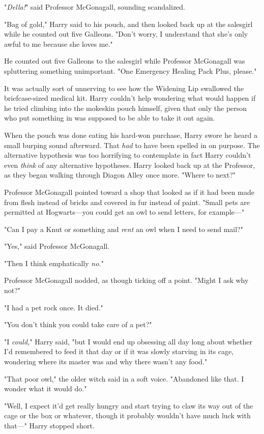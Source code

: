 "\emph{Della!}" said Professor McGonagall, sounding scandalized.

"Bag of gold," Harry said to his pouch, and then looked back up at the
salesgirl while he counted out five Galleons. "Don't worry, I understand that
she's only awful to me because she loves me."

He counted out five Galleons to the salesgirl while Professor McGonagall was
spluttering something unimportant. "One Emergency Healing Pack Plus, please."

It was actually sort of unnerving to see how the Widening Lip swallowed the
briefcase-sized medical kit. Harry couldn't help wondering what would happen if
he tried climbing into the mokeskin pouch himself, given that only the person
who put something in was supposed to be able to take it out again.

When the pouch was done{\el} eating{\el} his hard-won purchase, Harry
swore he heard a small burping sound afterward. That \emph{had} to have been
spelled in on purpose. The alternative hypothesis was too horrifying to
contemplate{\el} in fact Harry couldn't even \emph{think} of any alternative
hypotheses. Harry looked back up at the Professor, as they began walking
through Diagon Alley once more. "Where to next?"

Professor McGonagall pointed toward a shop that looked as if it had been made
from flesh instead of bricks and covered in fur instead of paint. "Small pets
are permitted at Hogwarts—you could get an owl to send letters, for
example—"

"Can I pay a Knut or something and \emph{rent} an owl when I need to send mail?"

"Yes," said Professor McGonagall.

"Then I think emphatically \emph{no.}"

Professor McGonagall nodded, as though ticking off a point. "Might I ask why
not?"

"I had a pet rock once. It died."

"You don't think you could take care of a pet?"

"I \emph{could,}" Harry said, "but I would end up obsessing all day long about
whether I'd remembered to feed it that day or if it was slowly starving in its
cage, wondering where its master was and why there wasn't any food."

"That poor owl," the older witch said in a soft voice. "Abandoned like that. I
wonder what it would do."

"Well, I expect it'd get really hungry and start trying to claw its way out of
the cage or the box or whatever, though it probably wouldn't have much luck
with that—" Harry stopped short.

